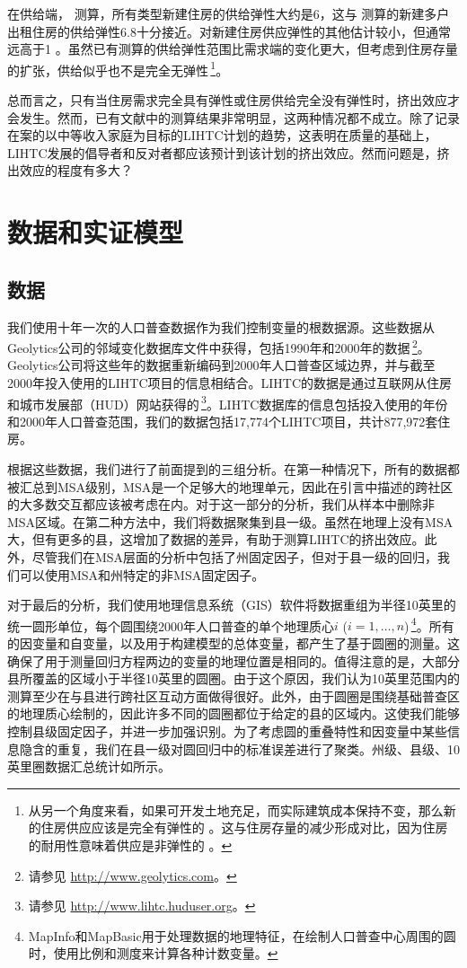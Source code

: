 \documentclass[lang=cn,11pt,a4paper]{paper}
\begin{document}
在供给端，\cite{Mayer200085} 测算，所有类型新建住房的供给弹性大约是6，这与 \cite{DiPasquale1992337} 测算的新建多户出租住房的供给弹性6.8十分接近。对新建住房供应弹性的其他估计较小，但通常远高于1 \citep{DiPasquale1992337,Rosen19791}。虽然已有测算的供给弹性范围比需求端的变化更大，但考虑到住房存量的扩张，供给似乎也不是完全无弹性\,\footnote{从另一个角度来看，如果可开发土地充足，而实际建筑成本保持不变，那么新的住房供应应该是完全有弹性的 \citep{Rosenthal1994182}。这与住房存量的减少形成对比，因为住房的耐用性意味着供应是非弹性的 \citep{Glaeser2005345}。}。

总而言之，只有当住房需求完全具有弹性或住房供给完全没有弹性时，挤出效应才会发生。然而，已有文献中的测算结果非常明显，这两种情况都不成立。除了记录在案的以中等收入家庭为目标的LIHTC计划的趋势，这表明在质量的基础上，LIHTC发展的倡导者和反对者都应该预计到该计划的挤出效应。然而问题是，挤出效应的程度有多大？

\section{数据和实证模型}\label{sec4}

\subsection{数据}

我们使用十年一次的人口普查数据作为我们控制变量的根数据源。这些数据从Geolytics公司的邻域变化数据库文件中获得，包括1990年和2000年的数据\,\footnote{请参见 \url{http://www.geolytics.com}。}。Geolytics公司将这些年的数据重新编码到2000年人口普查区域边界，并与截至2000年投入使用的LIHTC项目的信息相结合。LIHTC的数据是通过互联网从住房和城市发展部（HUD）网站获得的\,\footnote{请参见 \url{http://www.lihtc.huduser.org}。}。LIHTC数据库的信息包括投入使用的年份和2000年人口普查范围，我们的数据包括17,774个LIHTC项目，共计877,972套住房。

根据这些数据，我们进行了前面提到的三组分析。在第一种情况下，所有的数据都被汇总到MSA级别，MSA是一个足够大的地理单元，因此在引言中描述的跨社区的大多数交互都应该被考虑在内。对于这一部分的分析，我们从样本中删除非MSA区域。在第二种方法中，我们将数据聚集到县一级。虽然在地理上没有MSA大，但有更多的县，这增加了数据的差异，有助于测算LIHTC的挤出效应。此外，尽管我们在MSA层面的分析中包括了州固定因子，但对于县一级的回归，我们可以使用MSA和州特定的非MSA固定因子。

对于最后的分析，我们使用地理信息系统（GIS）软件将数据重组为半径10英里的统一圆形单位，每个圆围绕2000年人口普查的单个地理质心$i$ ($i = 1, \dots,n$)\,\footnote{MapInfo和MapBasic用于处理数据的地理特征，在绘制人口普查中心周围的圆时，使用比例和测度来计算各种计数变量。}。所有的因变量和自变量，以及用于构建模型的总体变量，都产生了基于圆圈的测量。这确保了用于测量回归方程两边的变量的地理位置是相同的。值得注意的是，大部分县所覆盖的区域小于半径10英里的圆圈。由于这个原因，我们认为10英里范围内的测算至少在与县进行跨社区互动方面做得很好。此外，由于圆圈是围绕基础普查区的地理质心绘制的，因此许多不同的圆圈都位于给定的县的区域内。这使我们能够控制县级固定因子，并进一步加强识别。为了考虑圆的重叠特性和因变量中某些信息隐含的重复，我们在县一级对圆回归中的标准误差进行了聚类。州级、县级、10英里圈数据汇总统计如所示。
\end{document}
